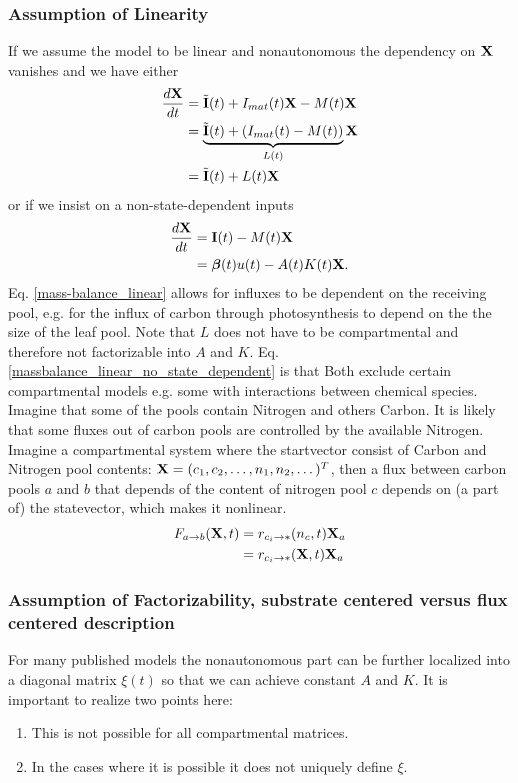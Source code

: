 \subsubsection{Assumption of Linearity}
If we assume the model to be linear and nonautonomous the dependency on $\mathbf{X}$ vanishes and we have
either
\begin{align}
\frac{d \mathbf{X}}{d t}
  &=\tilde{\mathbf{I}}(t)+I_{mat}(t)\mathbf{X} - M(t) \mathbf{X}  \nonumber
  \\
  &=\underbrace{\tilde{\mathbf{I}}(t)+(I_{mat}(t) - M(t))}_{L(t)} \mathbf{X} \label{massbalance_linear} \\
  &=\tilde{\mathbf{I}}(t)+L(t) \mathbf{X} \nonumber
\end{align}
or if we insist on a non-state-dependent inputs 
\begin{align}
\frac{d \mathbf{X}}{d t}
  &=\mathbf{I}(t) - M(t) \mathbf{X} \label{massbalance_linear_no_state_dependent}
  \\
  &= \bm{\beta}(t)u(t) - A(t) K(t) \mathbf{X} \nonumber.
\end{align} 
Eq. \eqref{mass-balance_linear} allows for influxes to be dependent on the receiving pool, e.g. for the influx of carbon through photosynthesis to depend on the the size of the leaf pool. Note that $L$ does not have to be compartmental and therefore not factorizable into $A$ and $K$.
Eq. \eqref{massbalance_linear_no_state_dependent} is that 
Both  exclude certain compartmental models e.g. some with interactions between chemical species. 
Imagine that some of the pools contain Nitrogen and others Carbon.
It is likely that some fluxes out of carbon pools are controlled by the
available Nitrogen.  
Imagine a compartmental system where the startvector
consist of Carbon and Nitrogen pool contents: $\mathbf{X}=(c_1,c_2,\dots,
n_1,n_2,\dots )^T$, then a flux between carbon pools $a$ and $b$ that
depends of the content of nitrogen pool $c$ depends on (a part of) the
statevector, which makes it nonlinear.
\begin{align*}
F_{a \rightarrow b} (\mathbf{X},t)  &= r_{c_i \rightarrow *}(n_c,t) \mathbf{X}_a \\
                            &= r_{c_i \rightarrow *}(\mathbf{X},t) \mathbf{X}_a
\end{align*}


\subsubsection{Assumption of Factorizability, substrate centered versus flux centered description}
For many published models the nonautonomous part  can be further localized into a diagonal matrix $\xi(t)$ so that we can achieve constant $A$ and $K$. It is important to realize two points here:
\begin{enumerate}
\item \label{substrate_xi}
  This is not possible for all compartmental matrices.
\item  \label{define_xi}
  In the cases where it is possible it does not uniquely define $\xi$.
\end{enumerate}

